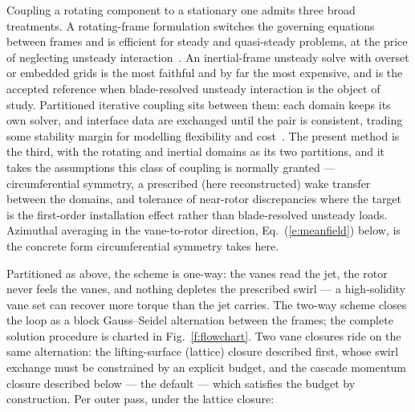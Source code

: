 \documentclass[]{aiaa-tc}%
\newcommand{\eqnref}[1]{(\ref{#1})}
\begin{document}
Coupling a rotating component to a stationary one admits three broad
treatments. A rotating-frame formulation switches the governing
equations between frames and is efficient for steady and quasi-steady
problems, at the price of neglecting unsteady
interaction~\cite{silva2021mrf}. An inertial-frame unsteady solve
with overset or embedded grids is the most faithful and by far the
most expensive, and is the accepted reference when blade-resolved
unsteady interaction is the object of study. Partitioned iterative
coupling sits between them: each domain keeps its own solver, and
interface data are exchanged until the pair is consistent, trading
some stability margin for modelling flexibility and
cost~\cite{xiongYu2007}. The present method is the third, with the
rotating and inertial domains as its two partitions, and it takes the
assumptions this class of coupling is normally granted ---
circumferential symmetry, a prescribed (here reconstructed) wake
transfer between the domains, and tolerance of near-rotor
discrepancies where the target is the first-order installation effect
rather than blade-resolved unsteady loads. Azimuthal averaging in the
vane-to-rotor direction, Eq.~\eqnref{e:meanfield} below, is the
concrete form circumferential symmetry takes here.

Partitioned as above, the scheme is one-way: the vanes read the jet,
the rotor never feels the vanes, and nothing depletes the prescribed
swirl --- a high-solidity vane set can recover more torque than the
jet carries. The two-way scheme closes the loop as a block
Gauss--Seidel alternation between the frames; the complete solution
procedure is charted in Fig.~\ref{f:flowchart}. Two vane closures ride
on the same alternation: the lifting-surface (lattice) closure
described first, whose swirl exchange must be constrained by an
explicit budget, and the cascade momentum closure described below ---
the default --- which satisfies the budget by construction. Per outer
pass, under the lattice closure:
\end{document}
